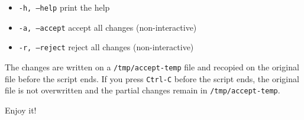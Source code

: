 \documentclass{article}
\begin{document}
\begin{itemize}
\item \texttt{-h, --help} print the help 

\item \texttt{-a, --accept} accept all changes
  (non-interactive) 
\item \texttt{-r, --reject} reject all changes (non-interactive)
\end{itemize}
The changes are written on a \texttt{/tmp/accept-temp} file and
recopied on the original file before the script ends. If you press
\texttt{Ctrl-C} before the script ends, the original file is not
overwritten and the partial changes remain in
\texttt{/tmp/accept-temp}.

Enjoy it! 
\end{document}
